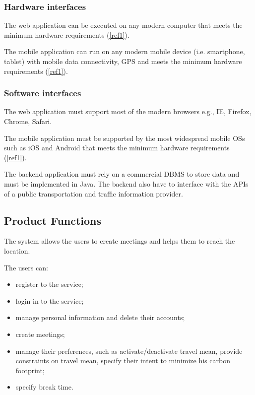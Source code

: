 \documentclass{article}
\begin{document}
	\subsubsection{Hardware interfaces}
	The web application can be executed on any modern computer that meets the minimum hardware requirements (\underline{\ref{ref1}}).
	
	\bigskip
	The mobile application can run on any modern mobile device (i.e. smartphone, tablet) with mobile data connectivity,  GPS and meets the minimum hardware requirements (\underline{\ref{ref1}}).


	\subsubsection{Software interfaces}
	The web application must support most of the modern browsers e.g., IE, Firefox, Chrome, Safari.
	
	\bigskip
	The mobile application must be supported by the most widespread mobile OSs such as iOS and Android that meets the minimum hardware requirements (\underline{\ref{ref1}}).

	\bigskip
	The backend application must rely on a commercial DBMS to store data and must be implemented in Java.
	The backend also have to interface with the APIs of a public transportation and  traffic information provider.
	
	
	\subsection{Product Functions}
	The system allows the users to create meetings and helps them to reach the location.
	
	The users can:
	\begin{itemize}
		\item register to the service;
		\item login in to the service;
		\item manage personal information and delete their accounts;
		\item create meetings;
		\item manage their preferences, such as activate/deactivate travel mean, provide constraints on travel mean, specify their intent to minimize his carbon footprint;
		\item specify break time.
	\end{itemize}
	
\end{document}
